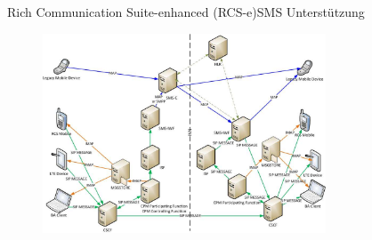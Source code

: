 \documentclass{beamer}
\begin{document}
\begin{frame}{Rich Communication Suite-enhanced (RCS-e)}{SMS Unterstützung\cite{rcs:spec,rcs:cpm,oma:cpm}}
	\begin{figure}[htm]
		\includegraphics[width=0.75\textwidth]{img/rcs-e-sms}
	\end{figure}
\end{frame}
\end{document}

